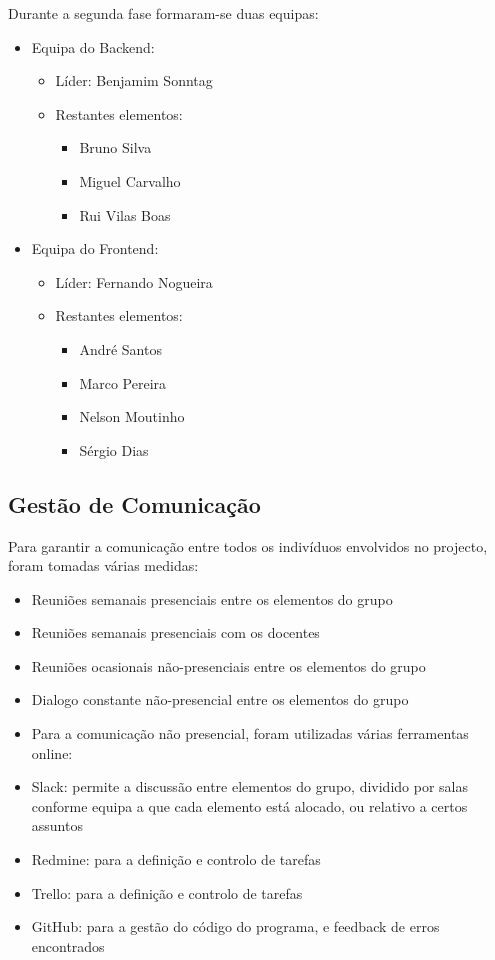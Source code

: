 Durante a segunda fase formaram-se duas equipas:
\begin{itemize}
    \item Equipa do Backend:
        \begin{itemize}
            \item Líder: Benjamim Sonntag
            \item Restantes elementos:
                \begin{itemize}
                    \item Bruno Silva
                    \item Miguel Carvalho
                    \item Rui Vilas Boas
                \end{itemize}
        \end{itemize}
    \item Equipa do Frontend:
        \begin{itemize}
            \item Líder: Fernando Nogueira
            \item Restantes elementos:
                \begin{itemize}
                    \item André Santos
                    \item Marco Pereira
                    \item Nelson Moutinho
                    \item Sérgio Dias
                \end{itemize}
        \end{itemize}
\end{itemize}

\subsection*{Gestão de Comunicação}
Para garantir a comunicação entre todos os indivíduos envolvidos no projecto, foram tomadas várias medidas:
\begin{itemize}
    \item Reuniões semanais presenciais entre os elementos do grupo
    \item Reuniões semanais presenciais com os docentes
    \item Reuniões ocasionais não-presenciais entre os elementos do grupo
    \item Dialogo constante não-presencial entre os elementos do grupo
    \item Para a comunicação não presencial, foram utilizadas várias ferramentas online:
    \item Slack: permite a discussão entre elementos do grupo, dividido por salas conforme equipa a que cada elemento está alocado, ou relativo a certos assuntos
    \item Redmine: para a definição e controlo de tarefas
    \item Trello: para a definição e controlo de tarefas
    \item GitHub: para a gestão do código do programa, e feedback de erros encontrados
\end{itemize}


